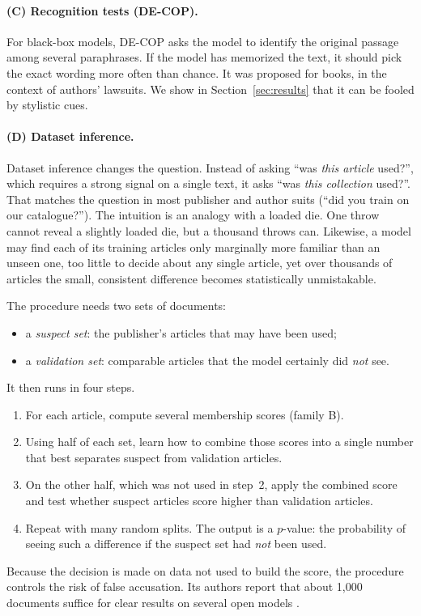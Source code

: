 \documentclass[10pt,a4paper]{article}
\begin{document}
\paragraph{(C) Recognition tests (DE-COP).} For black-box models, DE-COP \cite{duarte2024} asks the model to identify the
original passage among several paraphrases. If the model has memorized the text, it should pick the exact wording
more often than chance. It was proposed for books, in the context of authors' lawsuits. We show in
Section~\ref{sec:results} that it can be fooled by stylistic cues.

\paragraph{(D) Dataset inference.} Dataset inference \cite{maini2024} changes the question. Instead of asking ``was
\emph{this article} used?'', which requires a strong signal on a single text, it asks ``was \emph{this collection}
used?''. That matches the question in most publisher and author suits (``did you train on our catalogue?''). The
intuition is an analogy with a loaded die. One throw cannot reveal a slightly loaded die, but a thousand throws can.
Likewise, a model may find each of its training articles only marginally more familiar than an unseen one, too
little to decide about any single article, yet over thousands of articles the small, consistent difference becomes
statistically unmistakable.

The procedure needs two sets of documents:
\begin{itemize}
\item a \emph{suspect set}: the publisher's articles that may have been used;
\item a \emph{validation set}: comparable articles that the model certainly did \emph{not} see.
\end{itemize}
It then runs in four steps.
\begin{enumerate}
\item For each article, compute several membership scores (family B).
\item Using half of each set, learn how to combine those scores into a single number that best separates suspect
from validation articles.
\item On the other half, which was not used in step~2, apply the combined score and test whether suspect articles
score higher than validation articles.
\item Repeat with many random splits. The output is a $p$-value: the probability of seeing such a difference if the
suspect set had \emph{not} been used.
\end{enumerate}
Because the decision is made on data not used to build the score, the procedure controls the risk of false
accusation. Its authors report that about 1{,}000 documents suffice for clear results on several open models
\cite{maini2024}.
\end{document}
